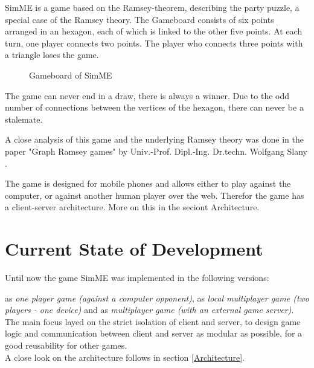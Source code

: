 SimME is a game based on the Ramsey-theorem, describing the party puzzle, a
special case of the Ramsey theory. The Gameboard consists of six points arranged
in an hexagon, each of which is linked to the other five points. At each turn,
one player connects two points. The player who connects three points with a
triangle loses the game.\medskip

\begin{figure}[h]
\begin{center}
\caption{Gameboard of SimME}
\end{center}
\end{figure}

The game can never end in a draw, there is always a winner. Due to the odd
number of connections between the vertices of the hexagon, there can never be a
stalemate.

A close analysis of this game and the underlying Ramsey theory was done in the
paper "Graph Ramsey games" by Univ.-Prof. Dipl.-Ing. Dr.techn. Wolfgang Slany
\cite{slany_paper}.

The game is designed for mobile phones and allows either to play against the
computer, or against another human player over the web. Therefor the game has a
client-server architecture. More on this in the seciont Architecture.


\section{Current State of Development}
Until now the game SimME was implemented in the following versions:

\noindent as \textit{one player game (against a computer opponent)}, as
\textit{local multiplayer game (two players - one device)} and as
\textit{multiplayer game (with an external game server)}.\\
The main focus layed on the strict isolation of client and server, to design
game logic and communication between client and server as modular as possible,
for a good reusability for other games. \\
A close look on the architecture follows in section \ref{Architecture}.


